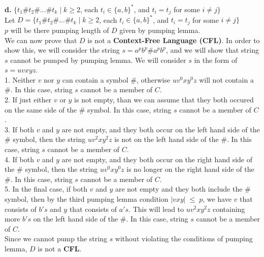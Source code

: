 \documentclass[12pt]{article}
\begin{document}
\textbf{d.} $\{t_1 \# t_2 \# ... \# t_k \; | \; k \geq 2$, each $t_i \in \{a, b\}^*$, and $t_i = t_j$ for some $i \ne j \} $ \\

Let $D = \{t_1 \# t_2 \# ... \# t_k \; | \; k \geq 2$, each $t_i \in \{a, b\}^*$, and $t_i = t_j$ for some $i \ne j \} $ \\
$p$ will be there pumping length of $D$ given by pumping lemma. \\

We can now prove that $D$ is not a \textbf{Context-Free Language (CFL)}.
In order to show this, we will consider the string $s = a^p b^p \# a^p b^p $,
and we will show that string $s$ cannot be pumped by pumping lemma. We will
consider $s$ in the form of $s = uvxyz$. \\

1. Neither $v$ nor $y$ can contain a symbol $\#$, otherwise $u v^0 x y^0 z$
will not contain a $\#$. In this case, string $s$ cannot be a member of $C$. \\

2. If just either $v$ or $y$ is not empty, than we can assume that they both occured
on the same side of the $\#$ symbol. In this case, string $s$ cannot be a member of $C$. \\

3. If both $v$ and $y$ are not empty, and they both occur on the left hand side
of the $\#$ symbol, then the string $u v^2 x y^2 z$ is not on the left hand
side of the $\#$. In this case, string $s$ cannot be a member of $C$. \\

4. If both $v$ and $y$ are not empty, and they both occur on the right hand side
of the $\#$ symbol, then the string $u v^0 x y^0 z$ is no longer on the
right hand side of the $\#$. In this case, string $s$ cannot be a member of $C$. \\

5. In the final case, if both $v$ and $y$ are not empty and they both include
the $\#$ symbol, then by the third pumping lemma condition $|vxy| \; \le \; p$,
we have $v$ that consists of $b's$ and $y$ that consists of $a's$. This will
lead to $u v^2 x y^2 z$ containing more $b's$ on the left hand side of the $\#$.
In this case, string $s$ cannot be a member of $C$. \\

Since we cannot pump the string $s$ without violating the conditions of
pumping lemma, $D$ is not a \textbf{CFL}. \\
\end{document}
